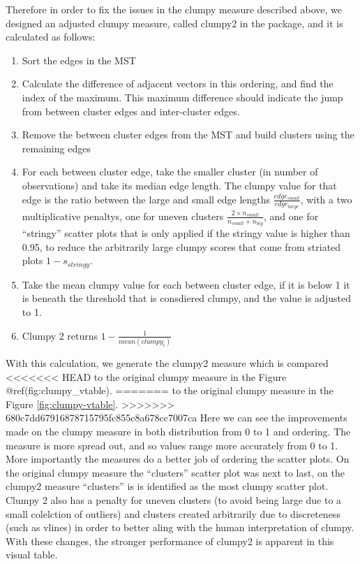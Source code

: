 Therefore in order to fix the issues in the clumpy measure described
above, we designed an adjusted clumpy measure, called clumpy2 in the
package, and it is calculated as follows:

\begin{enumerate}
\def\labelenumi{\arabic{enumi}.}
\tightlist
\item
  Sort the edges in the MST
\item
  Calculate the difference of adjacent vectors in this ordering, and
  find the index of the maximum. This maximum difference should indicate
  the jump from between cluster edges and inter-cluster edges.
\item
  Remove the between cluster edges from the MST and build clusters using
  the remaining edges
\item
  For each between cluster edge, take the smaller cluster (in number of
  observations) and take its median edge length. The clumpy value for
  that edge is the ratio between the large and small edge lengths
  \(\frac{edge_{small}}{edge_{large}}\), with a two multiplicative
  penaltys, one for uneven clusters
  \(\frac{2\times n_{small}}{n_{small}+n_{big}}\), and one for
  ``stringy'' scatter plots that is only applied if the stringy value is
  higher than 0.95, to reduce the arbitrarily large clumpy scores that
  come from striated plots \(1-s_{stringy}\).
\item
  Take the mean clumpy value for each between cluster edge, if it is
  below 1 it is beneath the threshold that is consdiered clumpy, and the
  value is adjusted to 1.
\item
  Clumpy 2 returns \(1-\frac{1}{mean(clumpy_i)}\)
\end{enumerate}

With this calculation, we generate the clumpy2 measure which is compared
<<<<<<< HEAD
to the original clumpy measure in the Figure @ref(fig:clumpy\_vtable).
=======
to the original clumpy measure in the Figure \ref{fig:clumpy-vtable}.
>>>>>>> 680c7dd67916878715795fc855c8a678cc7007ca
Here we can see the improvements made on the clumpy measure in both
distribution from 0 to 1 and ordering. The measure is more spread out,
and so values range more accurately from 0 to 1. More importantly the
measures do a better job of ordering the scatter plots. On the original
clumpy measure the ``clusters'' scatter plot was next to last, on the
clumpy2 measure ``clusters'' is is identified as the most clumpy scatter
plot. Clumpy 2 also has a penalty for uneven clusters (to avoid being
large due to a small colelction of outliers) and clusters created
arbitrarily due to discreteness (such as vlines) in order to better
aling with the human interpretation of clumpy. With these changes, the
stronger performance of clumpy2 is apparent in this visual table.

